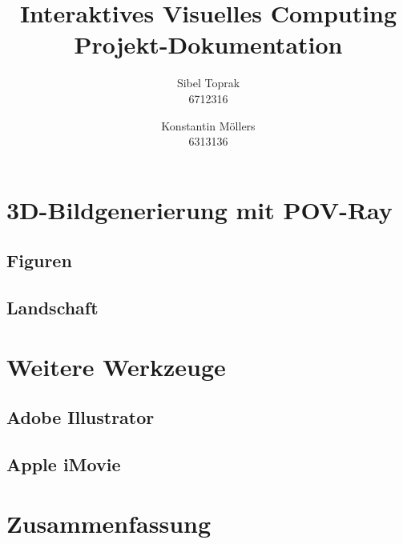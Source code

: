 \documentclass[a4paper,12pt]{article}
\title{\textbf{Interaktives Visuelles Computing}\\Projekt-Dokumentation}
\author{Sibel Toprak\\6712316 \and Konstantin M\"ollers\\6313136}
\begin{document}
	\maketitle	
	
	\section{3D-Bildgenerierung mit POV-Ray}
	
	\subsection{Figuren}
	
	\subsection{Landschaft}
	
	\section{Weitere Werkzeuge}
	
	\subsection{Adobe Illustrator}
	
	\subsection{Apple iMovie}
	
	\section{Zusammenfassung}
\end{document}
